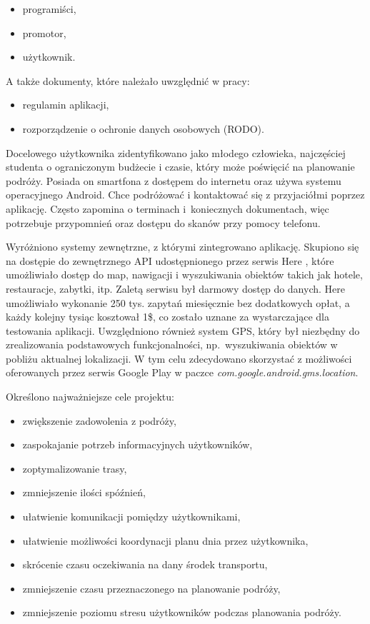 \documentclass[10pt,twoside,a4paper]{report}
\begin{document}
\begin{itemize}
\item programiści,
\item promotor,
\item użytkownik.
\end{itemize}

\noindent A także dokumenty, które należało uwzględnić w pracy:

\begin{itemize}
\item regulamin aplikacji,
\item rozporządzenie o ochronie danych osobowych (RODO).
\end{itemize}

\par Docelowego użytkownika zidentyfikowano jako młodego człowieka, najczęściej studenta o ograniczonym budżecie i czasie, który może poświęcić na planowanie podróży. Posiada on smartfona z dostępem do internetu oraz używa systemu operacyjnego Android. Chce podróżować i kontaktować się z przyjaciółmi poprzez aplikację. Często zapomina o terminach i~koniecznych dokumentach, więc potrzebuje przypomnień oraz dostępu do skanów przy pomocy telefonu.

\par Wyróżniono systemy zewnętrzne, z którymi zintegrowano aplikację. Skupiono się na dostępie do zewnętrznego API udostępnionego przez serwis Here \cite{Here}, które umożliwiało dostęp do map, nawigacji i wyszukiwania obiektów takich jak hotele, restauracje, zabytki, itp. Zaletą serwisu był darmowy dostęp do danych. Here umożliwiało wykonanie 250 tys. zapytań miesięcznie bez dodatkowych opłat, a każdy kolejny tysiąc kosztował 1\$, co zostało uznane za wystarczające dla testowania aplikacji. Uwzględniono również system GPS, który był niezbędny do zrealizowania podstawowych funkcjonalności, np.~wyszukiwania obiektów w pobliżu aktualnej lokalizacji. W tym celu zdecydowano skorzystać z możliwości oferowanych przez serwis Google Play w paczce \textit{com.google.android.gms.location}\cite{gms.location}.

\par
\noindent \newline Określono najważniejsze cele projektu:

\begin{itemize}
\item zwiększenie zadowolenia z podróży,
\item zaspokajanie potrzeb informacyjnych użytkowników,
\item zoptymalizowanie trasy,
\item zmniejszenie ilości spóźnień,
\item ułatwienie komunikacji pomiędzy użytkownikami,
\item ułatwienie możliwości koordynacji planu dnia przez użytkownika,
\item skrócenie czasu oczekiwania na dany środek transportu,
\item zmniejszenie czasu przeznaczonego na planowanie podróży,
\item zmniejszenie poziomu stresu użytkowników podczas planowania podróży.
\end{itemize}
\end{document}

